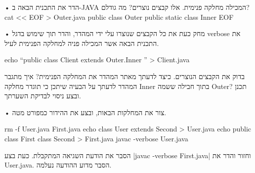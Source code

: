 \begin{enumerate}
• הדר את התכנית הבאה ב-JAVA המכילה מחלקה פנימית. אלו קבצים נוצרים? מה גודלם?
cat << EOF > Outer.java
public class Outer {
  public static class Inner {
  }
}
EOF
\END

• מחק כעת את כל הקבצים שנוצרו עלי ידי המהדר, והדר תוך שימוש בדגל verbose את
התכנית הבאה אשר המכילה פניה למחלקה הפנימית לעיל.

echo “public class Client extends Outer.Inner { }” > Client.java
\END

 בדוק את הקבצים הנוצרים. כיצד לדעתך מאתר המהדר את המחלקה הפנימית? איך מתגבר
המהדר לדעתך על הבעיה שיתכן כי תוגדר מחלקה Inner בתוך חבילה ששמה Outer? תכנן
ובצע ניסוי לבדיקת השערתך.

• צור את המחלקות הבאות, ובצע את ההידור כמפורט מטה.

rm -f User.java First.java
echo class User extends Second {} > User.java
echo public class First {} class Second{} > First.java
javac -verbose User.java
\END

הסבר את הודעת השגיאה המתקבלת. כעת בצע
\E|javac -verbose First.java|
 וחזור והדר את User.java.
הסבר מדוע ההודעה נעלמה.

\end{enumerate}
